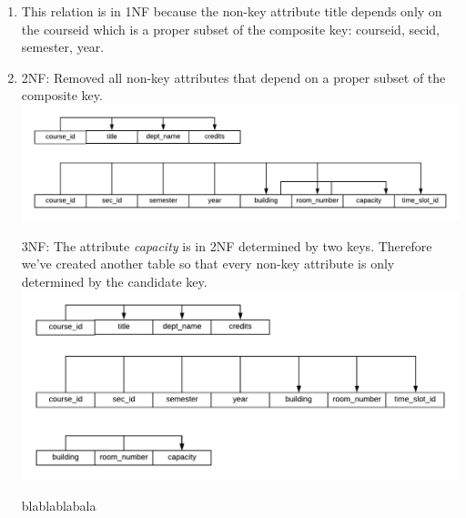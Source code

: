 ﻿\documentclass[12pt,letterpaper]{article}
\begin{document}
\begin{enumerate}[label={4.\arabic*},nolistsep,leftmargin=*]
  \item
   This relation is in 1NF because the non-key attribute title depends only on the course\textunderscore id which is a proper subset of the composite key: course\textunderscore id, sec\textunderscore id, semester, year.
  \item
    2NF: Removed all non-key attributes that depend on a proper subset of the composite key.  \\
    \includegraphics[width=1.0\textwidth, center]{images/2NF.png}
    
    \newpage
    3NF: The attribute \textit{capacity} is in 2NF determined by two keys. Therefore we've created another table so that every non-key attribute is only determined by the candidate key.  \\
    \includegraphics[width=1.0\textwidth, center]{images/3NF.png}

blablablabala

\end{enumerate}
\end{document}
